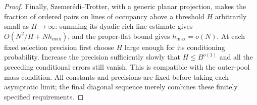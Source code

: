 \begin{proof}
Finally, Szemer\'edi--Trotter, with a generic planar projection,
makes the fraction of ordered pairs on lines of occupancy above
a threshold $H$ arbitrarily small as $H\to\infty$: summing its
dyadic rich-line estimate gives $O(N^2/H+N h_{\max})$, and the
proper-flat bound gives $h_{\max}=o(N)$.  At each fixed selection
precision first choose $H$ large enough for its conditioning
probability.  Increase the precision sufficiently slowly that
$H\le B^{o(1)}$ and all the preceding conditional errors still
vanish.  This is compatible with the outer-pool mass condition.
All constants and precisions are fixed before taking each
asymptotic limit; the final diagonal sequence merely combines
these finitely specified requirements.
\end{proof}
